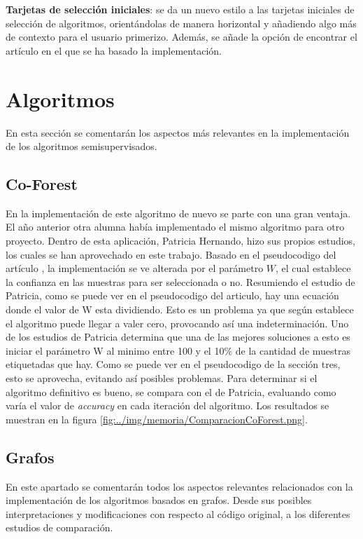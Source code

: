 \textbf{Tarjetas de selección iniciales}: se da un nuevo estilo a las tarjetas iniciales de selección de algoritmos, orientándolas de manera horizontal y añadiendo algo más de contexto para el usuario primerizo. Además, se añade la opción de encontrar el artículo en el que se ha basado la implementación.
\section{Algoritmos}
En esta sección se comentarán los aspectos más relevantes en la implementación de los algoritmos semisupervisados.
\subsection{Co-Forest}\label{sec5:coforest}
En la implementación de este algoritmo de nuevo se parte con una gran ventaja. El año anterior otra alumna había implementado el mismo algoritmo para otro proyecto. Dentro de esta aplicación, Patricia Hernando, hizo sus propios estudios, los cuales se han aprovechado en este trabajo.
Basado en el pseudocodigo del artículo \cite{IEEE:CoForest}, la implementación se ve alterada por el parámetro $W$, el cual establece la confianza en las muestras para ser seleccionada o no. Resumiendo el estudio de Patricia, como se puede ver en el pseudocodigo del articulo, hay una ecuación donde el valor de W esta dividiendo. Esto es un problema ya que según establece el algoritmo puede llegar a valer cero, provocando así una indeterminación. Uno de los estudios de Patricia determina que una de las mejores soluciones a esto es iniciar el parámetro W al minimo entre 100 y el 10\% de la cantidad de muestras etiquetadas que hay. Como se puede ver en el pseudocodigo de la sección tres, esto se aprovecha, evitando así posibles problemas.
Para determinar si el algoritmo definitivo es bueno, se compara con el de Patricia, evaluando como varía el valor de \textit{accuracy} en cada iteración del algoritmo. Los resultados se muestran en la figura \ref{fig:../img/memoria/ComparacionCoForest.png}.

\subsection{Grafos}
En este apartado se comentarán todos los aspectos relevantes relacionados con la implementación de los algoritmos basados en grafos. Desde sus posibles interpretaciones y modificaciones con respecto al código original, a los diferentes estudios de comparación.

